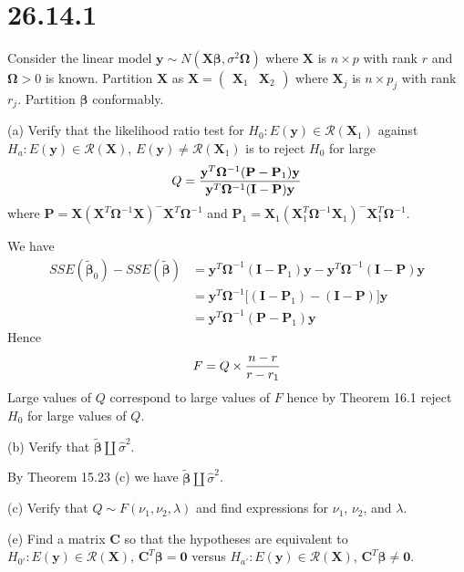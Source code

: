 \section*{26.14.1}
Consider the linear model $\mathbf y\sim N(\mathbf X\bm\beta,
\sigma^2\bm\Omega)$ where $\mathbf X$ is $n\times p$ with rank
$r$ and $\bm\Omega>0$ is known.
Partition $\mathbf X$ as
$\mathbf X=\begin{pmatrix}\mathbf X_1 & \mathbf X_2\end{pmatrix}$
where $\mathbf X_j$ is $n\times p_j$ with rank $r_j$.
Partition $\bm\beta$ conformably.

\bigskip
\noindent
(a) Verify that the likelihood ratio test for
$H_0:E(\mathbf y)\in\mathcal R(\mathbf X_1)$ against
$H_a:E(\mathbf y)\in\mathcal R(\mathbf X)$,
$E(\mathbf y)\ne\mathcal R(\mathbf X_1)$ is to reject
$H_0$ for large
\[
Q={
\mathbf y^T\bm\Omega^{-1}(\mathbf P-\mathbf P_1)\mathbf y
\over
\mathbf y^T\bm\Omega^{-1}(\mathbf I-\mathbf P)\mathbf y
}
\]
where $\mathbf P=\mathbf X(\mathbf X^T\bm\Omega^{-1}\mathbf X)^{-{}}
\mathbf X^T\bm\Omega^{-1}$ and
$\mathbf P_1=\mathbf X_1(\mathbf X_1^T\bm\Omega^{-1}\mathbf X_1)^{-{}}
\mathbf X_1^T\bm\Omega^{-1}$.

\bigskip
\noindent
We have
\begin{align*}
SSE(\bm{\widetilde\beta}_0)-SSE(\bm{\widetilde\beta})
&=
\mathbf y^T\bm\Omega^{-1}(\mathbf I-\mathbf P_1)\mathbf y-
\mathbf y^T\bm\Omega^{-1}(\mathbf I-\mathbf P)\mathbf y\\
&=
\mathbf y^T\bm\Omega^{-1}\bigg[
(\mathbf I-\mathbf P_1)-(\mathbf I-\mathbf P)\bigg]\mathbf y\\
&=
\mathbf y^T\bm\Omega^{-1}(\mathbf P-\mathbf P_1)\mathbf y
\end{align*}
Hence
\[
F=Q\times{n-r\over r-r_1}
\]
Large values of $Q$ correspond to large values of $F$ hence
by Theorem 16.1 reject $H_0$ for large values of $Q$.

\bigskip
\noindent
(b) Verify that $\bm{\widetilde\beta}\amalg\widehat\sigma^2$.

\bigskip
\noindent
By Theorem 15.23 (c) we have
$\bm{\widetilde\beta}\amalg\widehat\sigma^2$.

\bigskip
\noindent
(c) Verify that $Q\sim F(\nu_1,\nu_2,\lambda)$ and find
expressions for $\nu_1$, $\nu_2$, and $\lambda$.

\bigskip
\noindent
(e) Find a matrix $\mathbf C$ so that the hypotheses are
equivalent to
$H_{0'}:E(\mathbf y)\in\mathcal R(\mathbf X)$,
$\mathbf C^T\bm\beta=\mathbf 0$ versus
$H_{a'}:E(\mathbf y)\in\mathcal R(\mathbf X)$,
$\mathbf C^T\bm\beta\ne\mathbf0$.

